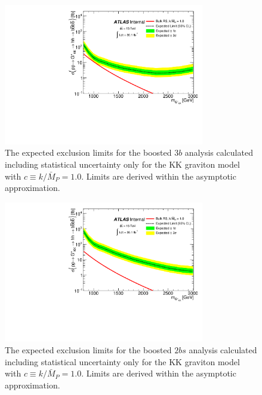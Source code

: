 \begin{figure}
\begin{center}
\includegraphics[angle=270, width=0.78\textwidth]{figures/boosted/Limit_Stat/BrazilPlot_Asymptotic_RSGC10_merged_3b.pdf}
\caption{The expected exclusion limits for the boosted $3b$ analysis calculated including statistical uncertainty only
for the KK graviton model with $c \equiv k/\bar{M}_P = 1.0$. Limits are derived within the asymptotic approximation.}
\label{fig:brazil_hh_boosted_3b_c10_stat}
\end{center}
\end{figure}

\begin{figure}
\begin{center}
\includegraphics[angle=270, width=0.78\textwidth]{figures/boosted/Limit_Stat/BrazilPlot_Asymptotic_RSGC10_merged_2b.pdf}
\caption{The expected exclusion limits for the boosted $2bs$ analysis calculated including statistical uncertainty only
for the KK graviton model with $c \equiv k/\bar{M}_P = 1.0$. Limits are derived within the asymptotic approximation.}
\label{fig:brazil_hh_boosted_2b_c10_stat}
\end{center}
\end{figure}


